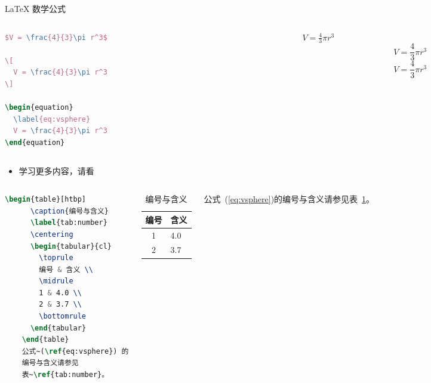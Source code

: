 \documentclass{beamer}
\begin{document}
\begin{frame}[fragile]{\LaTeX{} 数学公式}
    \begin{columns}
        \begin{column}{.55\textwidth}
\begin{lstlisting}[language=TeX]
$V = \frac{4}{3}\pi r^3$

\[
  V = \frac{4}{3}\pi r^3
\]

\begin{equation}
  \label{eq:vsphere}
  V = \frac{4}{3}\pi r^3
\end{equation}
\end{lstlisting}
        \end{column}
        \begin{column}{.4\textwidth}
            $V = \frac{4}{3}\pi r^3$
            \[
                V = \frac{4}{3}\pi r^3
            \]
            \begin{equation}
                \label{eq:vsphere}
                V = \frac{4}{3}\pi r^3
            \end{equation}
        \end{column}
    \end{columns}
    \begin{itemize}
        \item 学习更多内容，请看 \href{https://zh.wikipedia.org/wiki/Help:数学公式}{\color{deepblue}{这里}}
    \end{itemize}
\end{frame}

\begin{frame}[fragile]
    \begin{columns}
\begin{lstlisting}[language=TeX]
    \begin{table}[htbp]
      \caption{编号与含义}
      \label{tab:number}
      \centering
      \begin{tabular}{cl}
        \toprule
        编号 & 含义 \\
        \midrule
        1 & 4.0 \\
        2 & 3.7 \\
        \bottomrule
      \end{tabular}
    \end{table}
    公式~(\ref{eq:vsphere}) 的
    编号与含义请参见
    表~\ref{tab:number}。
\end{lstlisting}
        \begin{table}[htpb]
            \centering
            \caption{编号与含义}
            \label{tab:number}
            \begin{tabular}{cl}\toprule
                编号 & 含义 \\\midrule
                1 & 4.0\\
                2 & 3.7\\\bottomrule
            \end{tabular}
        \end{table}
        \normalsize 公式~(\ref{eq:vsphere})的编号与含义请参见表~\ref{tab:number}。
    \end{columns}
\end{frame}
\end{document}
